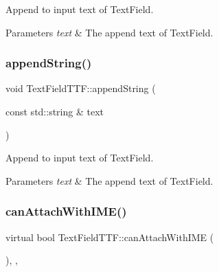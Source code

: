 Append to input text of Text\+Field. 
\begin{DoxyParams}{Parameters}
{\em text} & The append text of Text\+Field. \\
\hline
\end{DoxyParams}
\mbox{\label{classTextFieldTTF_aeaa280136373197c96b63209ba98fcc6}} 
\subsubsection{\texorpdfstring{append\+String()}{appendString()}\hspace{0.1cm}{\footnotesize\ttfamily [2/2]}}
{\footnotesize\ttfamily void Text\+Field\+T\+T\+F\+::append\+String (\begin{DoxyParamCaption}\item[{const std\+::string \&}]{text }\end{DoxyParamCaption})\hspace{0.3cm}{\ttfamily [virtual]}}

Append to input text of Text\+Field. 
\begin{DoxyParams}{Parameters}
{\em text} & The append text of Text\+Field. \\
\hline
\end{DoxyParams}
\mbox{\label{classTextFieldTTF_ae7c6616963045e08c065bf42e272f584}} 
\subsubsection{\texorpdfstring{can\+Attach\+With\+I\+M\+E()}{canAttachWithIME()}\hspace{0.1cm}{\footnotesize\ttfamily [1/2]}}
{\footnotesize\ttfamily virtual bool Text\+Field\+T\+T\+F\+::can\+Attach\+With\+I\+ME (\begin{DoxyParamCaption}{ }\end{DoxyParamCaption})\hspace{0.3cm}{\ttfamily [override]}, {\ttfamily [protected]}, {\ttfamily [virtual]}}




